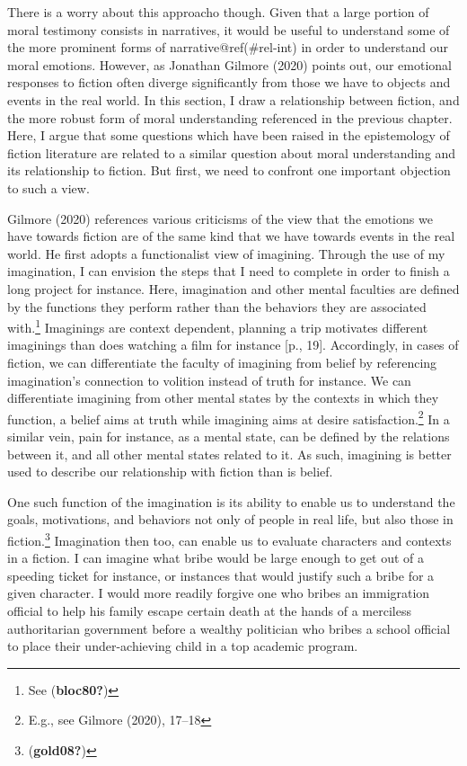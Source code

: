 \documentclass[12pt]{book}
\theoremstyle{definition}
\theoremstyle{remark}
\begin{document}
There is a worry about this approacho though. Given that a large portion of moral testimony consists in narratives, it would be useful to understand some of the more prominent forms of narrative@ref(\#rel-int) in order to understand our moral emotions. However, as Jonathan Gilmore (2020) points out, our emotional responses to fiction often diverge significantly from those we have to objects and events in the real world. In this section, I draw a relationship between fiction, and the more robust form of moral understanding referenced in the previous chapter. Here, I argue that some questions which have been raised in the epistemology of fiction literature are related to a similar question about moral understanding and its relationship to fiction. But first, we need to confront one important objection to such a view.

Gilmore (2020) references various criticisms of the view that the emotions we have towards fiction are of the same kind that we have towards events in the real world. He first adopts a functionalist view of imagining. Through the use of my imagination, I can envision the steps that I need to complete in order to finish a long project for instance. Here, imagination and other mental faculties are defined by the functions they perform rather than the behaviors they are associated with.\footnote{See (\textbf{bloc80?})} Imaginings are context dependent, planning a trip motivates different imaginings than does watching a film for instance {[}p., 19{]}. Accordingly, in cases of fiction, we can differentiate the faculty of imagining from belief by referencing imagination's connection to volition instead of truth for instance. We can differentiate imagining from other mental states by the contexts in which they function, a belief aims at truth while imagining aims at desire satisfaction.\footnote{E.g., see Gilmore (2020), 17--18} In a similar vein, pain for instance, as a mental state, can be defined by the relations between it, and all other mental states related to it. As such, imagining is better used to describe our relationship with fiction than is belief.

One such function of the imagination is its ability to enable us to understand the goals, motivations, and behaviors not only of people in real life, but also those in fiction.\footnote{(\textbf{gold08?})} Imagination then too, can enable us to evaluate characters and contexts in a fiction. I can imagine what bribe would be large enough to get out of a speeding ticket for instance, or instances that would justify such a bribe for a given character. I would more readily forgive one who bribes an immigration official to help his family escape certain death at the hands of a merciless authoritarian government before a wealthy politician who bribes a school official to place their under-achieving child in a top academic program.
\end{document}
